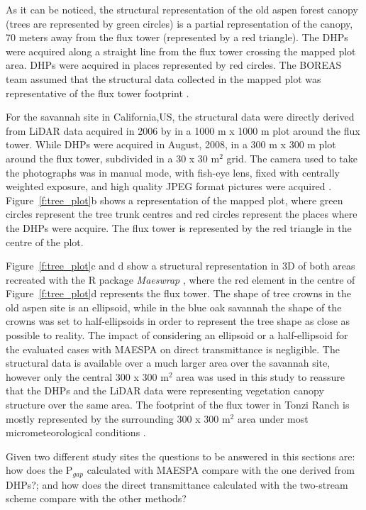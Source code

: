 \documentclass[a4paper,11pt]{report}
\begin{document}
As it can be noticed, the structural representation of the old aspen forest canopy (trees are represented by green circles) is a partial representation of the canopy, 70 meters away from the flux tower (represented by a red triangle). The DHPs were acquired along a straight line from the flux tower crossing the mapped plot area. DHPs were acquired in places represented by red circles. The BOREAS team assumed that the structural data collected in the mapped plot was representative of the flux tower footprint \citep{chen1997}.

For the savannah site in California,US, the structural data were directly derived from LiDAR data acquired in 2006 by \citet{Chen2006} in a 1000 m x 1000 m plot around the flux tower. While DHPs were acquired in August, 2008, in a 300 m x 300 m plot around the flux tower, subdivided in a 30 x 30 m$^2$ grid. The camera used to take the photographs was in manual mode, with fish-eye lens, fixed with centrally weighted exposure, and high quality JPEG format pictures were acquired \citep{Ryu2010}. Figure~\ref{f:tree_plot}b shows a representation of the mapped plot, where green circles represent the tree trunk centres and red circles represent the places where the DHPs were acquire. The flux tower is represented by the red triangle in the centre of the plot.

Figure~\ref{f:tree_plot}c and d show a structural representation in 3D of both areas recreated with the R package \textit{Maeswrap} \citep{Duursma2015}, where the red element in the centre of Figure~\ref{f:tree_plot}d represents the flux tower. The shape of tree crowns in the old aspen site is an ellipsoid, while in the blue oak savannah the shape of the crowns was set to half-ellipsoids in order to represent the tree shape as close as possible to reality. The impact of considering an ellipsoid or a half-ellipsoid for the evaluated cases with MAESPA on direct transmittance is negligible. The structural data is available over a much larger area over the savannah site, however only the central 300 x 300 m$^2$ area was used in this study to reassure that the DHPs and the LiDAR data were representing vegetation canopy structure over the same area. The footprint of the flux tower in Tonzi Ranch is mostly represented by the surrounding 300 x 300 m$^2$ area under most micrometeorological conditions \citep{Baldocchi2006}.

Given two different study sites the questions to be answered in this sections are: how does the P$_{gap}$ calculated with MAESPA compare with the one derived from DHPs?; and how does the direct transmittance calculated with the two-stream scheme compare with the other methods?
\end{document}
